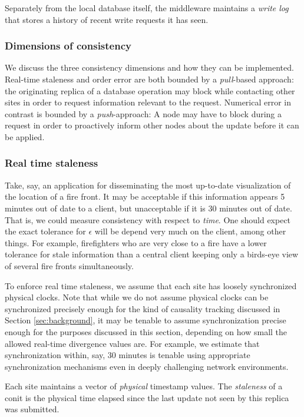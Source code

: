 \documentclass[]             %
{NASA}                       %
\theoremstyle{definition}
\begin{document}
Separately from the local database itself, the middleware maintains a
\emph{write log} that stores a history of recent write requests it has
seen.

\subsubsection{Dimensions of consistency}
\label{measuring-consistency-on-conits}

We discuss the three consistency dimensions and how they can be
implemented. Real-time staleness and order error are both bounded by a
\emph{pull}-based approach: the originating replica of a database
operation may block while contacting other sites in order to request
information relevant to the request. Numerical error in contrast is
bounded by a \emph{push}-approach: A node may have to block during a
request in order to proactively inform other nodes about the update
before it can be applied.

\subsubsection{Real time staleness}
\label{sssec:real-time-consistency}
Take, say, an application for disseminating the most up-to-date
visualization of the location of a fire front. It may be acceptable if
this information appears 5 minutes out of date to a client, but
unacceptable if it is 30 minutes out of date. That is, we could
measure consistency with respect to \emph{time}. One should expect the
exact tolerance for \(\epsilon\) will be depend very much on the
client, among other things. For example, firefighters who are very
close to a fire have a lower tolerance for stale information than a
central client keeping only a birds-eye view of several fire fronts
simultaneously.

To enforce real time staleness, we assume that each site has loosely
synchronized physical clocks. Note that while we do not assume
physical clocks can be synchronized precisely enough for the kind of
causality tracking discussed in Section \ref{sec:background}, it may
be tenable to assume synchronization precise enough for the purposes
discussed in this section, depending on how small the allowed
real-time divergence values are. For example, we estimate that
synchronization within, say, 30 minutes is tenable using appropriate
synchronization mechanisms even in deeply challenging network
environments.

Each site maintains a vector of \emph{physical} timestamp values. The
\emph{staleness} of a conit is the physical time elapsed since the
last update not seen by this replica was submitted.
\end{document}
